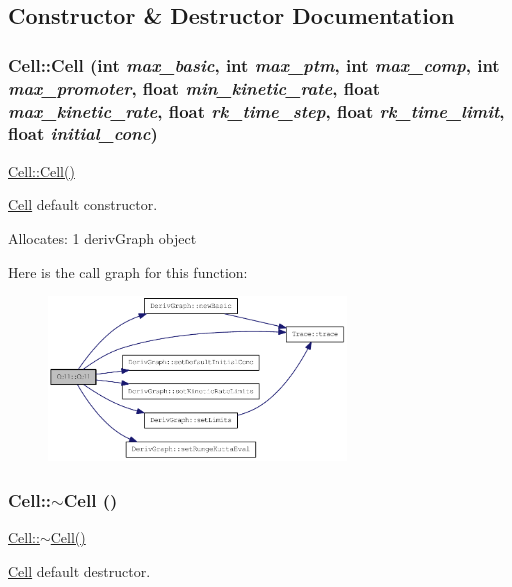 \subsection{Constructor \& Destructor Documentation}
\hypertarget{classCell_af85b728fb894b346b654eea910958180}{
\subsubsection[{Cell}]{\setlength{\rightskip}{0pt plus 5cm}Cell::Cell (int {\em max\_\-basic}, \/  int {\em max\_\-ptm}, \/  int {\em max\_\-comp}, \/  int {\em max\_\-promoter}, \/  float {\em min\_\-kinetic\_\-rate}, \/  float {\em max\_\-kinetic\_\-rate}, \/  float {\em rk\_\-time\_\-step}, \/  float {\em rk\_\-time\_\-limit}, \/  float {\em initial\_\-conc})}}
\label{classCell_af85b728fb894b346b654eea910958180}
\hyperlink{classCell_af85b728fb894b346b654eea910958180}{Cell::Cell()}

\hyperlink{classCell}{Cell} default constructor.

Allocates: 1 derivGraph object 

Here is the call graph for this function:\nopagebreak
\begin{figure}[H]
\begin{center}
\leavevmode
\includegraphics[width=224pt]{classCell_af85b728fb894b346b654eea910958180_cgraph}
\end{center}
\end{figure}
\hypertarget{classCell_a9fa559f7a28e2b4336c6879ca09304d8}{
\subsubsection[{$\sim$Cell}]{\setlength{\rightskip}{0pt plus 5cm}Cell::$\sim$Cell ()}}
\label{classCell_a9fa559f7a28e2b4336c6879ca09304d8}
\hyperlink{classCell_a9fa559f7a28e2b4336c6879ca09304d8}{Cell::$\sim$Cell()}

\hyperlink{classCell}{Cell} default destructor.

